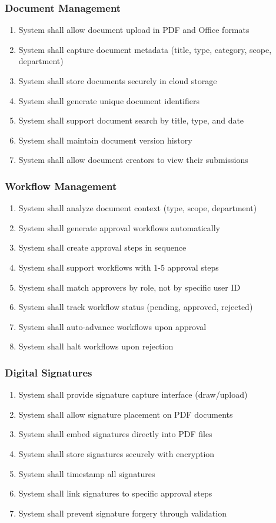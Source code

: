 \subsubsection{Document Management}
\begin{enumerate}[label=FR-DM-\arabic*]
\item System shall allow document upload in PDF and Office formats
\item System shall capture document metadata (title, type, category, scope, department)
\item System shall store documents securely in cloud storage
\item System shall generate unique document identifiers
\item System shall support document search by title, type, and date
\item System shall maintain document version history
\item System shall allow document creators to view their submissions
\end{enumerate}

\subsubsection{Workflow Management}
\begin{enumerate}[label=FR-WF-\arabic*]
\item System shall analyze document context (type, scope, department)
\item System shall generate approval workflows automatically
\item System shall create approval steps in sequence
\item System shall support workflows with 1-5 approval steps
\item System shall match approvers by role, not by specific user ID
\item System shall track workflow status (pending, approved, rejected)
\item System shall auto-advance workflows upon approval
\item System shall halt workflows upon rejection
\end{enumerate}

\subsubsection{Digital Signatures}
\begin{enumerate}[label=FR-SIG-\arabic*]
\item System shall provide signature capture interface (draw/upload)
\item System shall allow signature placement on PDF documents
\item System shall embed signatures directly into PDF files
\item System shall store signatures securely with encryption
\item System shall timestamp all signatures
\item System shall link signatures to specific approval steps
\item System shall prevent signature forgery through validation
\end{enumerate}

